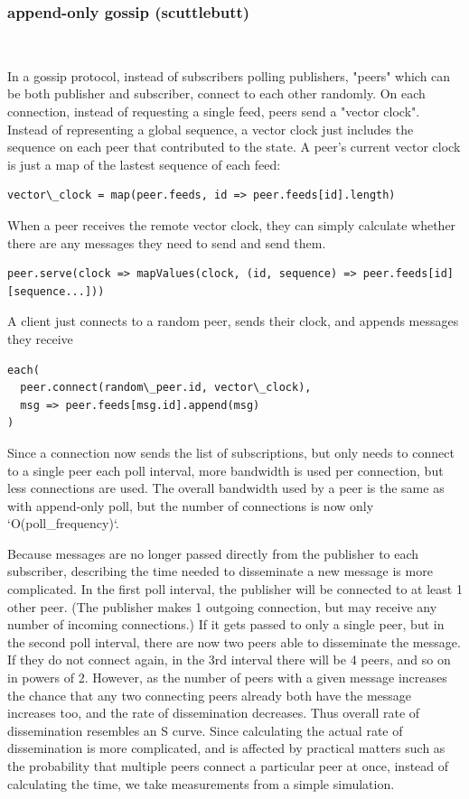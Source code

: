 \documentclass[sigconf]{acmart}
\begin{document}
\subsubsection{append-only gossip (scuttlebutt)}\ \\ \vspace{-1em}

In a gossip protocol, instead of subscribers polling publishers,
"peers" which can be both publisher and subscriber, connect to each
other randomly.  On each connection, instead of requesting a single
feed, peers send a "vector clock".  Instead of representing a global
sequence, a vector clock just includes the sequence on each peer that
contributed to the state. A peer's current vector clock is just a map
of the lastest sequence of each feed:

\begin{verbatim}
vector\_clock = map(peer.feeds, id => peer.feeds[id].length)
\end{verbatim}

When a peer receives the remote vector clock, they can simply
calculate whether there are any messages they need to send and send
them.

\begin{verbatim}
peer.serve(clock => mapValues(clock, (id, sequence) => peer.feeds[id][sequence...]))
\end{verbatim}

A client just connects to a random peer, sends their clock, and
appends messages they receive

\begin{verbatim}
each(
  peer.connect(random\_peer.id, vector\_clock),
  msg => peer.feeds[msg.id].append(msg)
)
\end{verbatim}

Since a connection now sends the list of subscriptions, but only needs
to connect to a single peer each poll interval, more bandwidth is used
per connection, but less connections are used.  The overall bandwidth
used by a peer is the same as with append-only poll, but the number of
connections is now only `O(poll\_frequency)`.

Because messages are no longer passed directly from the publisher to
each subscriber, describing the time needed to disseminate a new
message is more complicated.  In the first poll interval, the
publisher will be connected to at least 1 other peer.  (The publisher
makes 1 outgoing connection, but may receive any number of incoming
connections.)  If it gets passed to only a single peer, but in the
second poll interval, there are now two peers able to disseminate the
message. If they do not connect again, in the 3rd interval there will
be 4 peers, and so on in powers of 2. However, as the number of peers
with a given message increases the chance that any two connecting
peers already both have the message increases too, and the rate of
dissemination decreases. Thus overall rate of dissemination resembles
an S curve. Since calculating the actual rate of dissemination is more
complicated, and is affected by practical matters such as the
probability that multiple peers connect a particular peer at once,
instead of calculating the time, we take measurements from a simple
simulation.
\end{document}
